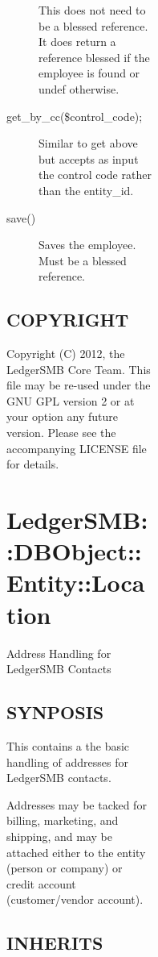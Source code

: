 \begin{description}
\begin{description}
\begin{description}
\begin{description}
\begin{description}
\begin{description}
\begin{description}
\begin{description}
\begin{description}
This does not need to be a blessed reference.  It does return a reference 
blessed if the employee is found or undef otherwise.


\item[{get\_by\_cc(\$control\_code);}] \mbox{}

Similar to get above but accepts as input the control code rather than the
entity\_id.


\item[{save()}] \mbox{}

Saves the employee.  Must be a blessed reference.

\end{description}
\subsection*{COPYRIGHT\label{LedgerSMB::DBObject::Entity::Person::Employee_-_-_Employee_handling_for_LedgerSMB_COPYRIGHT}}


Copyright (C) 2012, the LedgerSMB Core Team.  This file may be re-used under 
the GNU GPL version 2 or at your option any future version.  Please see the 
accompanying LICENSE file for details.

\section{LedgerSMB::DBObject::Entity::Location\label{LedgerSMB::DBObject::Entity::Location}}


Address Handling for LedgerSMB Contacts

\subsection*{SYNPOSIS\label{LedgerSMB::DBObject::Entity::Location_SYNPOSIS}}


This contains a the basic handling of addresses for LedgerSMB contacts.



Addresses may be tacked for billing, marketing, and shipping, and may be
attached either to the entity (person or company) or credit account
(customer/vendor account).

\subsection*{INHERITS\label{LedgerSMB::DBObject::Entity::Location_INHERITS}}
\begin{description}


\end{description}
\end{description}
\end{description}
\end{description}
\end{description}
\end{description}
\end{description}
\end{description}
\end{description}

